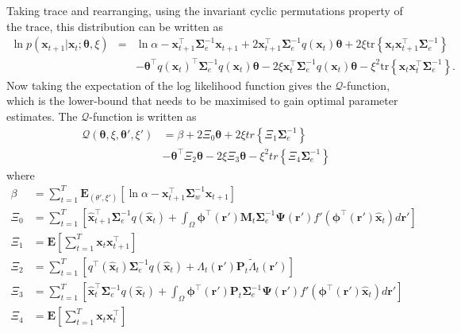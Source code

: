 \documentclass[]{article}
\begin{document}
Taking trace and rearranging, using the invariant cyclic permutations property of the trace, this distribution can be written as
\begin{eqnarray}\label{eq:Qfunctionintrace}
  \ln p(\mathbf x_{t+1} | \mathbf x_t;\boldsymbol\theta,\xi)&=&\ln \alpha-\mathbf x_{t+1}^\top\boldsymbol\Sigma_e^{-1}\mathbf x_{t+1}+2\mathbf x_{t+1}^\top\boldsymbol\Sigma_e^{-1}q( \mathbf x_t)\boldsymbol\theta+2\xi \mathrm{tr} \left\lbrace \mathbf x_t\mathbf x_{t+1}^\top\boldsymbol\Sigma_e^{-1}\right\rbrace \nonumber \\
&&-\boldsymbol\theta^\top q(\mathbf x_t)^\top\boldsymbol\Sigma_e^{-1}q(\mathbf x_t)\boldsymbol\theta-2\xi \mathbf x_t^\top\boldsymbol\Sigma_e^{-1}q(\mathbf x_t)\boldsymbol\theta-\xi^2\mathrm{tr}\left\lbrace \mathbf x_t \mathbf x_t^\top\boldsymbol\Sigma_e^{-1}\right\rbrace. 
\end{eqnarray}
Now taking the expectation of the log likelihood function gives the $\mathcal Q$-function, which is the lower-bound that needs to be maximised to gain optimal parameter estimates. The $\mathcal Q$-function is written as  
\begin{align}\label{eq:Voldermont}
 \mathcal Q(\boldsymbol \theta,\xi,\boldsymbol\theta',\xi')&=\beta+2\Xi_0\boldsymbol\theta+
2\xi tr\left\lbrace \Xi_1 \boldsymbol\Sigma_e^{-1}\right\rbrace \nonumber \\
&-\boldsymbol\theta^\top \Xi_2\boldsymbol\theta-2\xi \Xi_3 \boldsymbol\theta - \xi^2 tr \left\lbrace\Xi_4\boldsymbol\Sigma_e^{-1} \right\rbrace \tag{Voldermont}
\end{align}
where 
\begin{align}
	\beta &= \sum_{t=1}^T\mathbf E_{(\theta',\xi')}\left[ \ln \alpha-\mathbf x_{t+1}^\top\boldsymbol\Sigma_w^{-1}\mathbf x_{t+1}\right] \label{eq:def of beta} \\
\Xi_0&=\sum_{t=1}^T\left[ \mathbf{\hat x}_{t+1}^\top\boldsymbol\Sigma_e^{-1}q(\mathbf{\hat x}_t)+\int_\Omega\boldsymbol \phi^\top(\mathbf r') \mathbf M_t \boldsymbol\Sigma_e^{-1}  \boldsymbol{\Psi}(\mathbf{r}') f'(\boldsymbol \phi^\top(\mathbf r')\mathbf {\hat x}_t) d\mathbf{r}'\right] \\	
\Xi_1&=\mathbf E\left[\sum_{t=1}^T\mathbf x_t\mathbf x_{t+1}^\top\right] \\
\Xi_2&=\sum_{t=1}^T\left[q^\top(\mathbf{\hat x}_t)\boldsymbol\Sigma_e^{-1}q(\mathbf{\hat x}_t)+\Lambda_t(\mathbf r')\mathbf P_t \tilde{\Lambda}_t(\mathbf r')\right] \\
 \Xi_3&=\sum_{t=1}^T\left[ \mathbf{\hat x}_{t}^\top\boldsymbol\Sigma_e^{-1}q(\mathbf{\hat x}_t)+\int_\Omega\boldsymbol \phi^\top(\mathbf r') \mathbf P_t \boldsymbol\Sigma_e^{-1}  \boldsymbol{\Psi}(\mathbf{r}') f'(\boldsymbol \phi^\top(\mathbf r')\mathbf {\hat x}_t) d\mathbf{r}'\right] \\
 \Xi_4&=\mathbf E\left[\sum_{t=1}^T\mathbf x_t\mathbf x_{t}^\top\right]
\end{align}
\end{document}
